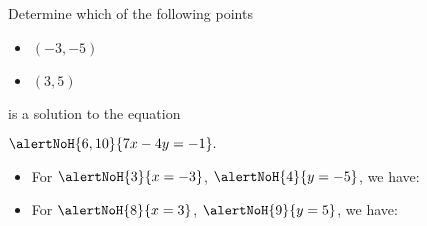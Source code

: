 \begin{frame}
\begin{example}
Determine which  of the following points
\begin{itemize}
\item $\left(-3, -5\right)$
\item $(3,5)$
\end{itemize}
is a solution to the equation 

\hfil \hfil $\alertNoH{6,10}{7x-4y=-1}.$ 
\begin{itemize}
\item<2-> For $\alertNoH{3}{x=-3}$, $\alertNoH{4}{y=-5}$, we have: 
\item<7-> For $\alertNoH{8}{x=3}$, $\alertNoH{9}{y=5}$, we have: 
\end{itemize}

\end{example}

\end{frame}

